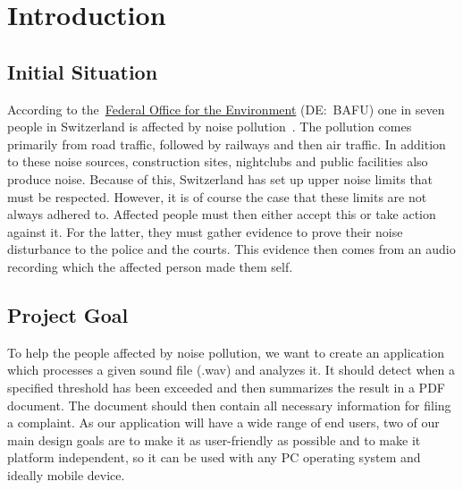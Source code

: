 \section{Introduction}\label{sec:introduction}

\subsection{Initial Situation}\label{subsec:initial-situation}
According to the~\href{https://www.bafu.admin.ch//}{Federal Office for the Environment} (DE:\ BAFU) one in seven people in Switzerland is affected by noise pollution~\cite{foen_noise_pollution}.
The pollution comes primarily from road traffic, followed by railways and then air traffic.
In addition to these noise sources, construction sites, nightclubs and public facilities also produce noise.
Because of this, Switzerland has set up upper noise limits that must be respected.
However, it is of course the case that these limits are not always adhered to.
Affected people must then either accept this or take action against it.
For the latter, they must gather evidence to prove their noise disturbance to the police and the courts.
This evidence then comes from an audio recording which the affected person made them self.

\subsection{Project Goal}\label{subsec:project-goal}
To help the people affected by noise pollution, we want to create an application which processes a given sound file (.wav)
and analyzes it.
It should detect when a specified threshold has been exceeded and then summarizes the result in a PDF document.
The document should then contain all necessary information for filing a complaint.
As our application will have a wide range of end users, two of our main design goals are to make it as user-friendly as possible
and to make it platform independent, so it can be used with any PC operating system and ideally mobile device.

